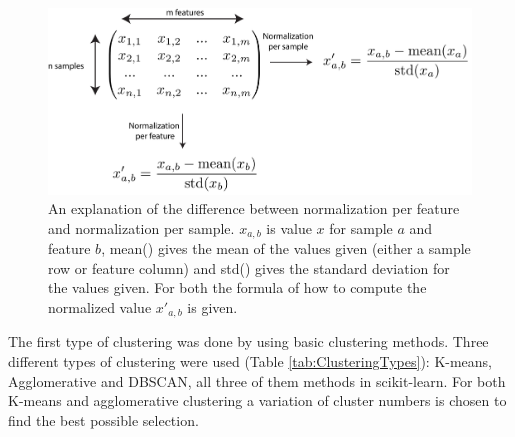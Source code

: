 \documentclass[10pt,a4paper]{report}
\begin{document}
	\begin{figure}[H]
		\includegraphics[width=1\textwidth]{Normalization.png}
		\caption{An explanation of the difference between normalization per feature and normalization per sample. $x_{a,b}$ is value $x$ for sample $a$ and feature $b$, mean() gives the mean of the values given (either a sample row or feature column) and std() gives the standard deviation for the values given. For both the formula of how to compute the normalized value $x'_{a,b}$ is given.}
		\label{fig:Normalization}
	\end{figure}
	
	The first type of clustering was done by using basic clustering methods. Three different types of clustering were used (Table \ref{tab:ClusteringTypes}): K-means, Agglomerative and DBSCAN, all three of them methods in scikit-learn. For both K-means and agglomerative clustering a variation of cluster numbers is chosen to find the best possible selection.
	
\end{document}
